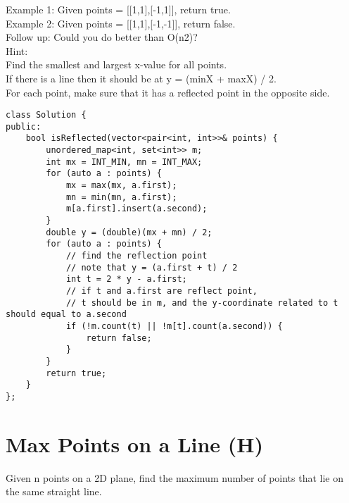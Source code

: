 Example 1:
Given points = [[1,1],[-1,1]], return true.\\

Example 2:
Given points = [[1,1],[-1,-1]], return false.\\

Follow up:
Could you do better than O(n2)?\\

Hint:\\
    Find the smallest and largest x-value for all points.\\
    If there is a line then it should be at y = (minX + maxX) / 2.\\
    For each point, make sure that it has a reflected point in the opposite side.\\

\begin{lstlisting}
class Solution {
public:
    bool isReflected(vector<pair<int, int>>& points) {
        unordered_map<int, set<int>> m;
        int mx = INT_MIN, mn = INT_MAX;
        for (auto a : points) {
            mx = max(mx, a.first);
            mn = min(mn, a.first);
            m[a.first].insert(a.second);
        }
        double y = (double)(mx + mn) / 2;
        for (auto a : points) {
            // find the reflection point
            // note that y = (a.first + t) / 2
            int t = 2 * y - a.first;
            // if t and a.first are reflect point, 
            // t should be in m, and the y-coordinate related to t should equal to a.second
            if (!m.count(t) || !m[t].count(a.second)) {
                return false;
            }
        }
        return true;
    }
};
\end{lstlisting}


\section{Max Points on a Line (H)}
Given n points on a 2D plane, find the maximum number of points that lie on the same straight line.\\

